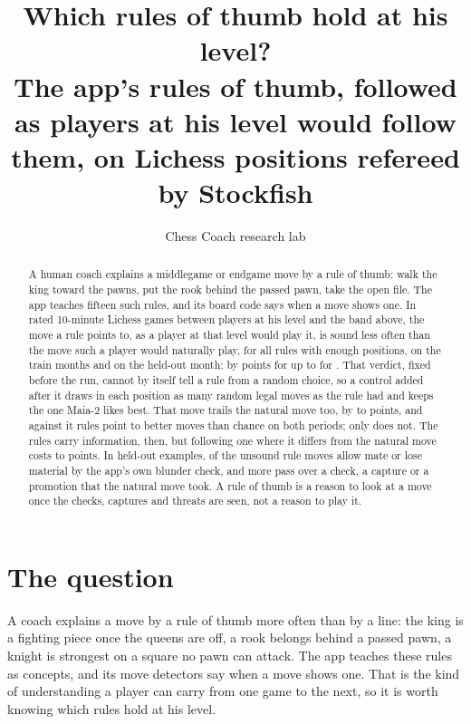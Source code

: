 \documentclass[11pt]{article}
\title{Which rules of thumb hold at his level?\\[0.3em]
\large The app's rules of thumb, followed as players at his level would follow them, on
\Scored{} Lichess positions refereed by Stockfish}
\author{Chess Coach research lab}
\date{}
\begin{document}
\maketitle

\begin{abstract}
A human coach explains a middlegame or endgame move by a rule of thumb: walk the king toward the
pawns, put the rook behind the passed pawn, take the open file. The app teaches fifteen such rules,
and its board code says when a move shows one. In rated 10-minute Lichess games between players at
his level and the band above, the move a rule points to, as a player at that level would play it,
is sound less often than the move such a player would naturally play, for all \Judged{} rules with
enough positions, on the train months and on the held-out month: by \LeastLift{} points for
\LeastLiftName{} up to \MostLift{} for \MostLiftName. That verdict, fixed before the run, cannot by
itself tell a rule from a random choice, so a control added after it draws in each position as many
random legal moves as the rule had and keeps the one Maia-2 likes best. That move trails the natural
move too, by \NullLow{} to \NullHigh{} points, and against it \NBetter{} rules point to better
moves than chance on both periods; only \NoDiffName{} does not. The rules carry information, then,
but following one where it differs from the natural move costs \CondLow{} to \CondHigh{} points. In
\ExN{} held-out examples, \ExCaught{} of the \ExUnsound{} unsound rule moves allow mate or lose
material by the app's own blunder check, and \ExForcing{} more pass over a check, a capture or a
promotion that the natural move took. A rule of thumb is a reason to look at a move once the checks,
captures and threats are seen, not a reason to play it.
\end{abstract}

\section{The question}

A coach explains a move by a rule of thumb more often than by a line: the king is a fighting piece
once the queens are off, a rook belongs behind a passed pawn, a knight is strongest on a square no
pawn can attack. The app teaches these rules as concepts, and its move detectors say when a move
shows one. That is the kind of understanding a player can carry from one game to the next, so it is
worth knowing which rules hold at his level.
\end{document}
